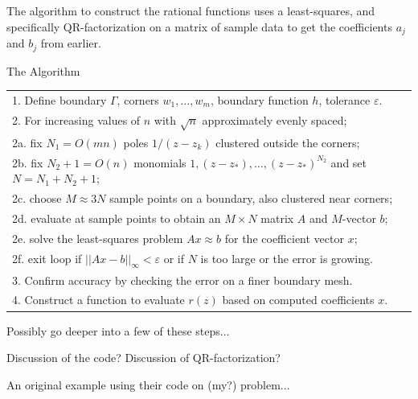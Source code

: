 \documentclass[12]{article}
\begin{document}
	The algorithm to construct the rational functions uses a least-squares, and specifically QR-factorization on a matrix of sample data to get the coefficients $a_j$ and $b_j$ from earlier.
	
	\begin{table}[h] The Algorithm \\
		\begin{tabular}{l}
			1. Define boundary $\Gamma$, corners $w_1,\ldots, w_m$, boundary function $h$, tolerance $\varepsilon$.	\\
			2. For increasing values of $n$ with $\sqrt{n}$	approximately evenly spaced; \\
			\: 2a. fix $N_1=O(mn)$ poles $1/(z-z_k)$ clustered outside the corners; \\
			\: 2b. fix $N_2+1=O(n)$ monomials $1,(z-z_*),\ldots,(z-z_*)^{N_2}$ and set $N=N_1+N_2+1$; \\
			\: 2c. choose $M\approx 3N$ sample points on a boundary, also clustered near corners; \\
			\: 2d. evaluate at sample points to obtain an $M\times N$ matrix $A$ and $M$-vector $b$; \\
			\: 2e. solve the least-squares problem $Ax\approx b$ for the coefficient vector $x$; \\
			\: 2f. exit loop if $||Ax-b||_\infty < \varepsilon$ or if $N$ is too large or the error is growing. \\
			3. Confirm accuracy by checking the error on a finer boundary mesh. \\
			4. Construct a function to evaluate $r(z)$ based on computed coefficients $x$.
		\end{tabular}
	\end{table}
	
	Possibly go deeper into a few of these steps... 
	
	Discussion of the code? Discussion of QR-factorization?
	
	An original example using their code on (my?) problem...
\end{document}
